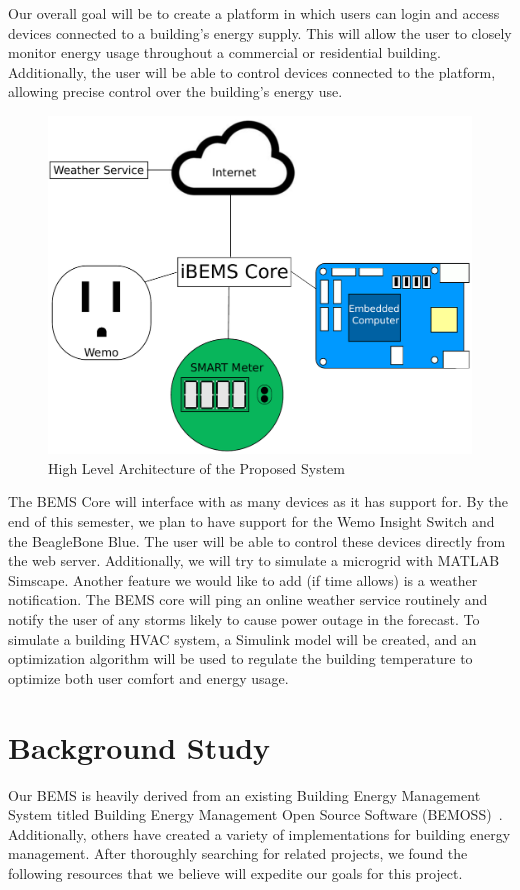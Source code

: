 \documentclass[letterpaper,12pt]{article}   %
\begin{document}
Our overall goal will be to create a platform in which users can login and access devices connected to a building's energy supply. This will allow the user to closely monitor energy usage throughout a commercial or residential building. Additionally, the user will be able to control devices connected to the platform, allowing precise control over the building's energy use.
\begin{figure}[H]
    \centering
    \includegraphics[scale=0.35]{figs/highLevelArchitecture.pdf}
    \caption{High Level Architecture of the Proposed System}
    \label{fig:highLevelArchitecture}
\end{figure}

The BEMS Core will interface with as many devices as it has support for. By the end of this semester, we plan to have support for the Wemo Insight Switch and the BeagleBone Blue. The user will be able to control these devices directly from the web server. Additionally, we will try to simulate a microgrid with MATLAB Simscape. Another feature we would like to add (if time allows) is a weather notification. The BEMS core will ping an online weather service routinely and notify the user of any storms likely to cause power outage in the forecast. To simulate a building HVAC system, a Simulink model will be created, and an optimization algorithm will be used to regulate the building temperature to optimize both user comfort and energy usage. 

\newpage
\section{Background Study} %
Our BEMS is heavily derived from an existing Building Energy Management System titled Building Energy Management Open Source Software (BEMOSS)~\cite{BEMOSS}. Additionally, others have created a variety of implementations for building energy management. After thoroughly searching for related projects, we found the following resources that we believe will expedite our goals for this project.
\end{document}
